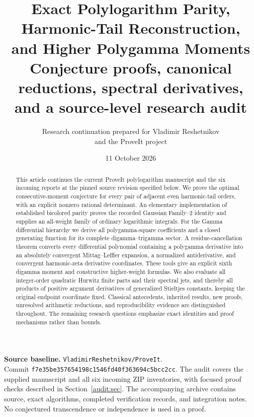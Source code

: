 \documentclass[11pt,a4paper]{article}
\title{\textbf{Exact Polylogarithm Parity, Harmonic-Tail Reconstruction,\\
and Higher Polygamma Moments}\\[5pt]
\large Conjecture proofs, canonical reductions, spectral derivatives,\\
and a source-level research audit}
\author{Research continuation prepared for Vladimir Reshetnikov\\
and the ProveIt project}
\date{11 October 2026}
\numberwithin{equation}{section}
\theoremstyle{definition}
\theoremstyle{remark}
\begin{document}
\maketitle
\begin{abstract}
This article continues the current ProveIt polylogarithm manuscript and
the six incoming reports at the pinned source revision specified below.
We prove the optimal consecutive-moment conjecture for every pair of
adjacent even harmonic-tail orders, with an explicit nonzero rational
determinant.  An elementary implementation of established bicolored
parity proves the recorded Gaussian Family--2 identity and supplies an
all-weight family of ordinary logarithmic integrals.  For the Gamma
differential hierarchy we derive all polygamma-square coefficients and
a closed generating function for its complete digamma--trigamma sector.
A residue-cancellation theorem converts every differential polynomial
containing a polygamma derivative into an absolutely convergent
Mittag--Leffler expansion, a normalized antiderivative, and convergent
harmonic-zeta derivative coordinates.  These tools give an explicit
sixth digamma moment and constructive higher-weight formulas.
We also evaluate all integer-order quadratic Hurwitz finite parts and
their spectral jets, and thereby all products of positive argument
derivatives of generalized Stieltjes constants, keeping the original
endpoint coordinate fixed.
Classical antecedents, inherited results, new proofs, unresolved
arithmetic reductions, and reproducibility evidence are distinguished
throughout.  The remaining research questions emphasize exact
identities and proof mechanisms rather than bounds.
\end{abstract}

\vspace{3pt}
\noindent\textbf{Source baseline.}
\texttt{VladimirReshetnikov/ProveIt}.\\
Commit \texttt{f7e35be357654198c1546fd40f363694c5bcc2cc}.
The audit covers the supplied manuscript and all six incoming ZIP
inventories, with focused proof checks described in Section~\ref{audit:sec}.
The accompanying archive contains source, exact algorithms, completed
verification records, and integration notes.  No conjectured
transcendence or independence is used in a proof.

\clearpage
{\small\setlength{\parskip}{0pt}\tableofcontents}
\newpage









\appendix



\end{document}
